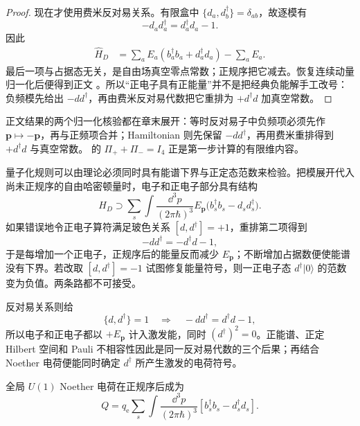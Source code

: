 \begin{proof}
现在才使用费米反对易关系。有限盒中
$\{d_a,d_b^\dagger\}=\delta_{ab}$，故逐模有
\[
 -d_ad_a^\dagger=d_a^\dagger d_a-1.
\]
因此
\begin{align*}
 \hat H_D
 &=\sum_aE_a\left(b_a^\dagger b_a+d_a^\dagger d_a\right)
 -\sum_aE_a.
\end{align*}
最后一项与占据态无关，是自由场真空零点常数；正规序把它减去。恢复连续动量归一化后便得到正文
。所以“正电子具有正能量”并不是把经典负能解手工改号：负频模先给出 $-d d^\dagger$，再由费米反对易代数把它重排为 $+d^\dagger d$ 加真空常数。
\end{proof}


正文结果的两个归一化核验都在章末展开：等时反对易子中负频项必须先作 $\mathbf p\mapsto-\mathbf p$，再与正频项合并；Hamiltonian 则先保留 $-d d^\dagger$，再用费米重排得到 $+d^\dagger d$ 与真空常数。 的 $\Pi_++\Pi_-=I_4$ 正是第一步计算的有限维内容。

\begin{exbox}
量子化规则可以由理论必须同时具有能谱下界与正定态范数来检验。把模展开代入尚未正规序的自由哈密顿量时，电子和正电子部分具有结构
\begin{equation*}
 H_D\supset
 \sum_s\int\frac{\dd^3 p}{(2\pi\hbar)^3}E_{\mathbf p}
 \bigl(b_s^\dagger b_s-d_s d_s^\dagger\bigr).
\end{equation*}
如果错误地令正电子算符满足玻色关系 $[d,d^\dagger]=+1$，重排第二项得到
\begin{equation*}
 -d d^\dagger=-d^\dagger d-1,
\end{equation*}
于是每增加一个正电子，正规序后的能量反而减少 $E_{\mathbf p}$；不断增加占据数便使能谱没有下界。若改取 $[d,d^\dagger]=-1$ 试图修复能量符号，则一正电子态 $d^\dagger|0\rangle$ 的范数变为负值。两条路都不可接受。

反对易关系则给
\begin{equation*}
 \{d,d^\dagger\}=1
 \quad\Longrightarrow\quad
 -d d^\dagger=d^\dagger d-1,
\end{equation*}
所以电子和正电子都以 $+E_{\mathbf p}$ 计入激发能，同时 $(d^\dagger)^2=0$。正能谱、正定 Hilbert 空间和 Pauli 不相容性因此是同一反对易代数的三个后果；再结合 Noether 电荷便能同时确定 $d^\dagger$ 所产生激发的电荷符号。
\end{exbox}

全局 $U(1)$ Noether 电荷在正规序后成为
\begin{equation}
\boxed{
Q=q_{\mathrm e}\sum_s\int\frac{\dd^3 p}{(2\pi\hbar)^3}
\left[b_s^\dagger b_s-d_s^\dagger d_s\right].}
\label{eq:dirac-charge-r2}
\end{equation}

